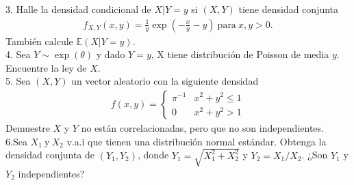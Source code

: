 \documentclass[11pt,letterpaper]{article}
\newcommand{\mE}{\mathbb{E}}
\begin{document}
3. Halle la densidad condicional de $X|Y=y$ si $(X,Y)$ tiene densidad conjunta \begin{align*}
f_{X,Y}(x,y)=\frac{1}{y}\exp \left(-\frac{x}{y}-y \right) \ \text{para} \ x,y>0.
\end{align*} 
También calcule $\mE(X|Y=y)$.\\

4. Sea $Y\sim \exp(\theta)$ y dado $Y=y$, X tiene distribución de Poisson de media $y$. Encuentre la ley de $X$.\\


5. Sea $(X, Y)$ un vector aleatorio con la siguiente densidad
\begin{align*}
f(x,y)=\left\{\begin{matrix}
\pi^{-1} & x^2+y^2\leq 1\\
0 & x^2+y^2>1
\end{matrix} \right.
\end{align*} 
Demuestre $X$ y $Y$ no están correlacionadas, pero que no son independientes.\\

6.Sea $X_1\ \text{y} \ X_2$ v.a.i que tienen una distribución normal estándar. Obtenga la densidad conjunta de $(Y_1, Y_2)$, donde $Y_1=\sqrt{X_1^2+X_2^2}$ y $Y_2=X_1/X_2$. ¿Son $Y_1$ y $Y_2$ independientes? \\
\end{document}
